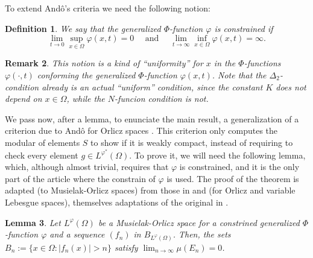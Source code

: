 \documentclass[11pt,a4paper]{amsart}
\newtheorem{definicion}{Definition}[section]
\newtheorem{lema}[definicion]{Lemma}
\newtheorem{nota}[definicion]{Remark}
\newcommand{\lphi}{{L^{\varphi}(\Omega)}}
\newcommand{\lphiconj}{{L^{\varphi^*}(\Omega)}}
\begin{document}
To extend And\^o's criteria we need the following notion:

\begin{definicion}
    We say that the generalized $\Phi$-function $\varphi$ is constrained if
    $$
    \lim_{t\rightarrow 0} \sup_{x\in\Omega} \varphi(x,t)=0 \quad \text{ and } \quad \lim_{t\rightarrow \infty} \inf_{x\in\Omega} \varphi(x,t)=\infty.
    $$
\end{definicion}

\begin{nota}
    This notion is a kind of ``uniformity'' for $x$ in the $\Phi$-functions $\varphi(\cdot,t)$ conforming the generalized $\Phi$-function $\varphi(x,t)$. Note that the $\Delta_2$-condition already is an actual ``uniform'' condition, since the constant $K$ does not depend on $x\in\Omega$, while the $N$-funcion condition is not.
\end{nota}


We pass now, after a lemma, to enunciate the main result, a generalization of a criterion due to Andô for Orlicz spaces \cite{Ando}. This criterion only computes the modular of elements $S$ to show if it is weakly compact, instead of requiring to check every element $g\in \lphiconj$. To prove it, we will need the following lemma, which, although almost trivial, requires that $\varphi$ is constrained, and it is the only part of the article where the constrain of $\varphi$ is used. The proof of the theorem is adapted (to Musielak-Orlicz spaces) from those in \cite{Nowak} and \cite{PCM3} (for Orlicz and variable Lebesgue spaces), themselves adaptations of the original in \cite{Ando}. %

\begin{lema}\label{mallema1}
    Let $\lphi$ be a Musielak-Orlicz space for a constrined generalized $\Phi$-function $\varphi$ and a sequence $(f_n)$ in $B_\lphi$. Then, the sets $B_n:=\{x\in\Omega:\vert f_n(x)\vert>n\}$ satisfy $\lim_{n\rightarrow\infty}\mu(E_n)=0$.
\end{lema}
\end{document}
